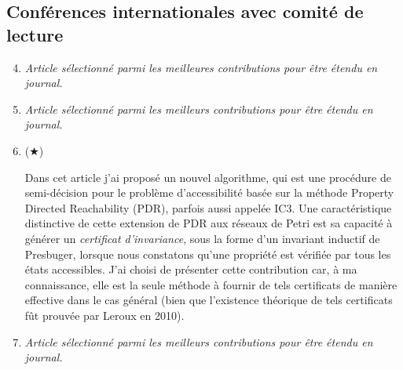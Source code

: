 \subsection*{Conférences internationales avec comité de lecture}
\vspace{10pt}
\begin{enumerate}
  \setcounter{enumi}{3}
  \item  \cite{amat_combination_2021} 
  \smallbreak
  \emph{Article sélectionné parmi les meilleures contributions pour être étendu en journal.}
  \smallbreak
  \item \cite{amat_accelerating_2021} 
  \smallbreak
  \emph{Article sélectionné parmi les meilleurs contributions pour être étendu en journal.}
  \smallbreak
  \item ($\bigstar$) \cite{amat_property_2022} 
  \begin{mdframed}
    Dans cet article j'ai proposé un nouvel algorithme, qui est une procédure de
  semi-décision pour le problème d'accessibilité basée sur la méthode Property
  Directed Reachability (PDR), parfois aussi appelée IC3. Une caractéristique
  distinctive de cette extension de PDR aux réseaux de Petri est sa capacité à
  générer un \emph{certificat d'invariance}, sous la forme d'un invariant
  inductif de Presbuger, lorsque nous constatons qu'une propriété est vérifiée
  par tous les états accessibles. J'ai choisi de présenter cette contribution
  car, à ma connaissance, elle est la seule méthode à fournir de tels
  certificats de manière effective dans le cas général (bien que l'existence
  théorique de tels certificats fût prouvée par Leroux en 2010).
  \end{mdframed}
  \smallbreak
  \item \cite{amat_kong_2022} 
  \smallbreak
  \emph{Article sélectionné parmi les meilleurs contributions pour être étendu en journal.}

\end{enumerate}
